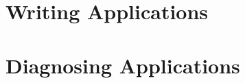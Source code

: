 \documentclass[11pt, oneside]{book}   	%
\begin{document}





\clearpage
\setcounter{page}{1}

\tableofcontents

\listoffigures

\hypersetup{linkcolor=violet}

%

\part{Writing Applications}
\label{part:writing-applications}

%
%
%

\part{Diagnosing Applications}
\label{part:diagnosing-applictions}

%
%
%
%
%
%








%
\end{document}
